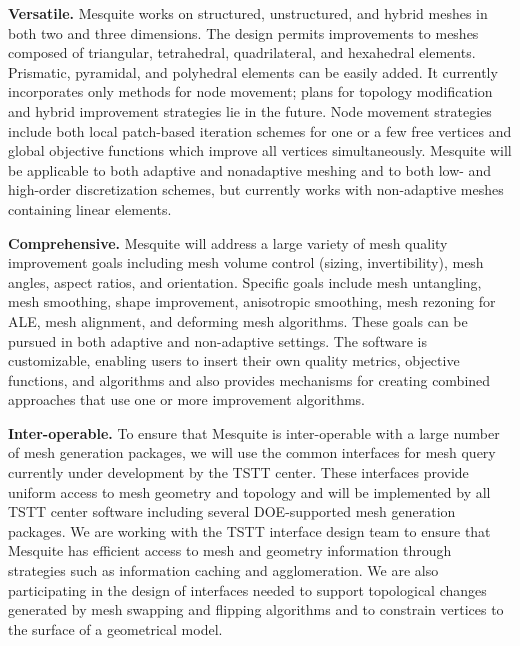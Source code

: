\documentclass[letter]{report}
\begin{document}
{\bf Versatile.}  Mesquite works on structured,
unstructured, and hybrid meshes in both two and three dimensions. The
design permits improvements to meshes composed of triangular,
tetrahedral, quadrilateral, and hexahedral elements. Prismatic,
pyramidal, and polyhedral elements can be easily added.  
It currently incorporates only methods for node movement; plans for 
topology modification and hybrid improvement strategies lie in the future.
Node movement strategies include both local patch-based iteration
schemes for one or a few free vertices and global objective functions
which improve all vertices simultaneously. Mesquite will be 
applicable to both adaptive and nonadaptive meshing and to both low-
and high-order discretization schemes, but currently works with
non-adaptive meshes containing linear elements. \newline

{\bf Comprehensive.}  Mesquite will address a large variety of mesh 
quality improvement goals including mesh volume control (sizing, 
invertibility), mesh angles, aspect ratios, and orientation. Specific 
goals include mesh untangling, mesh smoothing, shape improvement, anisotropic
smoothing, mesh rezoning for ALE, mesh alignment, and deforming mesh 
algorithms. These goals can be pursued in both adaptive and non-adaptive 
settings. The
software is customizable, enabling users to insert their own
quality metrics, objective functions, and algorithms and also provides
mechanisms for creating combined approaches that use one or more
improvement algorithms. \newline


{\bf Inter-operable.}  To ensure that Mesquite is inter-operable with a
large number of mesh generation packages, we will use the common
interfaces for mesh query currently under development by the TSTT
center.  These interfaces provide uniform access to mesh geometry and
topology and will be implemented by all TSTT center software including
several DOE-supported mesh generation packages.  We are working with
the TSTT interface design team to ensure that Mesquite has efficient
access to mesh and geometry information through strategies such as
information caching and agglomeration.  We are also participating in
the design of interfaces needed to support topological changes
generated by mesh swapping and flipping algorithms and to constrain
vertices to the surface of a geometrical model. \newline
\end{document}

